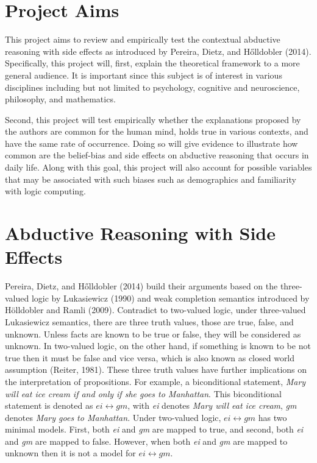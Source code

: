 \documentclass[]{interact}
\theoremstyle{plain}%
\theoremstyle{definition}
\theoremstyle{remark}
\begin{document}
\section{Project Aims}
This project aims to review and empirically test the contextual abductive reasoning with side effects as introduced by Pereira, Dietz, and Hőlldobler (2014). Specifically, this project will, first, explain the theoretical framework to a more general audience. It is important since this subject is of interest in various disciplines including but not limited to psychology, cognitive and neuroscience, philosophy, and mathematics. 

Second, this project will test empirically whether the explanations proposed by the authors are common for the human mind, holds true in various contexts, and have the same rate of occurrence. Doing so will give evidence to illustrate how common are the belief-bias and side effects on abductive reasoning that occurs in daily life. Along with this goal, this project will also account for possible variables that may be associated with such biases such as demographics and familiarity with logic computing.

\section{Abductive Reasoning with Side Effects} 
Pereira, Dietz, and Hőlldobler (2014) build their arguments based on the three-valued logic by Lukasiewicz (1990) and weak completion semantics introduced by Hölldobler and Ramli (2009). Contradict to two-valued logic, under three-valued Lukasiewicz semantics, there are three truth values, those are true, false, and unknown. Unless facts are known to be true or false, they will be considered as unknown. In two-valued logic, on the other hand, if something is known to be not true then it must be false and vice versa, which is also known as closed world assumption (Reiter, 1981). These three truth values have further implications on the interpretation of propositions. For example, a biconditional statement, \textit{Mary will eat ice cream if and only if she goes to Manhattan}. This biconditional statement is denoted as \( ei \leftrightarrow gm \), with \textit{ei} denotes \textit{Mary will eat ice cream}, \textit{gm} denotes \textit{Mary goes to Manhattan}. Under two-valued logic, \( ei \leftrightarrow gm \) has two minimal models. First, both \textit{ei} and \textit{gm} are mapped to true, and second, both \textit{ei} and \textit{gm} are mapped to false. However, when both \textit{ei} and \textit{gm} are mapped to unknown then it is not a model for \( ei \leftrightarrow gm \). 
\end{document}

